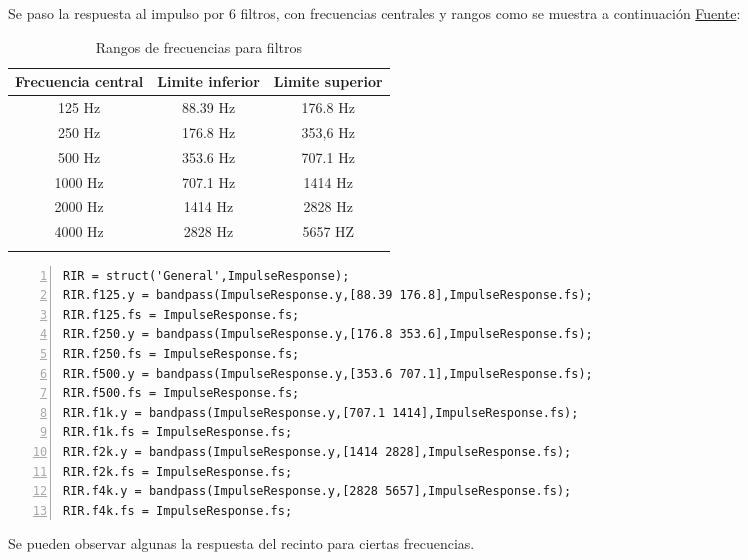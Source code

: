 Se paso la respuesta al impulso por 6 filtros, con frecuencias centrales y rangos como se muestra a continuación \href{https://www.doctorproaudio.com/content.php?2402-octaves-and-third-octaves#:~:text=As%20a%20reference%2C%20the%20central,exactly%20to%20double%20or%20half.}{Fuente}:
\begin{center}
    \begin{longtable}[!htb]{ |c|c|c| }
    \hline
    Frecuencia central & Limite inferior & Limite superior \\ 
    \hline
    125 Hz & 88.39 Hz & 176.8 Hz   \\  
    250 Hz & 176.8 Hz & 353,6 Hz   \\  
    500 Hz & 353.6 Hz & 707.1 Hz   \\  
    1000 Hz & 707.1 Hz & 1414 Hz   \\  
    2000 Hz & 1414 Hz & 2828 Hz     \\  
    4000 Hz & 2828 Hz & 5657 HZ   \\
    \hline
    \caption{Rangos de frecuencias para filtros}
    \label{tab:Rangos De Frecuencias}
    \end{longtable} 
\end{center}
\begin{lstlisting}[frame=single,numbers=left, style=Matlab-editor, basicstyle=\tiny]
RIR = struct('General',ImpulseResponse); 
RIR.f125.y = bandpass(ImpulseResponse.y,[88.39 176.8],ImpulseResponse.fs);
RIR.f125.fs = ImpulseResponse.fs;
RIR.f250.y = bandpass(ImpulseResponse.y,[176.8 353.6],ImpulseResponse.fs);
RIR.f250.fs = ImpulseResponse.fs;
RIR.f500.y = bandpass(ImpulseResponse.y,[353.6 707.1],ImpulseResponse.fs);
RIR.f500.fs = ImpulseResponse.fs;
RIR.f1k.y = bandpass(ImpulseResponse.y,[707.1 1414],ImpulseResponse.fs);
RIR.f1k.fs = ImpulseResponse.fs;
RIR.f2k.y = bandpass(ImpulseResponse.y,[1414 2828],ImpulseResponse.fs);
RIR.f2k.fs = ImpulseResponse.fs;
RIR.f4k.y = bandpass(ImpulseResponse.y,[2828 5657],ImpulseResponse.fs);
RIR.f4k.fs = ImpulseResponse.fs;
\end{lstlisting}
Se pueden observar algunas la respuesta del recinto para ciertas frecuencias.
